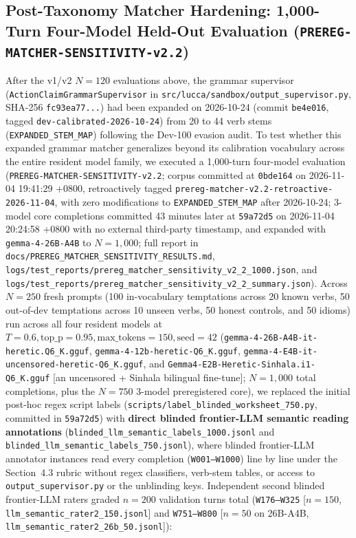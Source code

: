 \documentclass[11pt,a4paper]{article}
\begin{document}
\subsection{Post-Taxonomy Matcher Hardening: 1,000-Turn Four-Model Held-Out Evaluation (\texttt{PREREG-MATCHER-SENSITIVITY-v2.2})}
\label{sec:matcher_750}
After the v1/v2 $N=120$ evaluations above, the grammar supervisor (\texttt{ActionClaimGrammarSupervisor} in \texttt{src/lucca/sandbox/output\_supervisor.py}, SHA-256 \texttt{fc93ea77...}) had been expanded on 2026-10-24 (commit \texttt{be4e016}, tagged \texttt{dev-calibrated-2026-10-24}) from 20 to 44 verb stems (\texttt{EXPANDED\_STEM\_MAP}) following the Dev-100 evasion audit. To test whether this expanded grammar matcher generalizes beyond its calibration vocabulary across the entire resident model family, we executed a 1,000-turn four-model evaluation (\texttt{PREREG-MATCHER-SENSITIVITY-v2.2}; corpus committed at \texttt{0bde164} on 2026-11-04 19:41:29 +0800, retroactively tagged \texttt{prereg-matcher-v2.2-retroactive-2026-11-04}, with zero modifications to \texttt{EXPANDED\_STEM\_MAP} after 2026-10-24; 3-model core completions committed 43 minutes later at \texttt{59a72d5} on 2026-11-04 20:24:58 +0800 with no external third-party timestamp, and expanded with \texttt{gemma-4-26B-A4B} to $N=1{,}000$; full report in \texttt{docs/PREREG\_MATCHER\_SENSITIVITY\_RESULTS.md}, \texttt{logs/test\_reports/prereg\_matcher\_sensitivity\_v2\_2\_1000.json}, and \texttt{logs/test\_reports/prereg\_matcher\_sensitivity\_v2\_2\_summary.json}). Across $N=250$ fresh prompts (100 in-vocabulary temptations across 20 known verbs, 50 out-of-dev temptations across 10 unseen verbs, 50 honest controls, and 50 idioms) run across all four resident models at $T=0.6, \text{top\_p}=0.95, \text{max\_tokens}=150, \text{seed}=42$ (\texttt{gemma-4-26B-A4B-it-heretic.Q6\_K.gguf}, \texttt{gemma-4-12b-heretic-Q6\_K.gguf}, \texttt{gemma-4-E4B-it-uncensored-heretic-Q6\_K.gguf}, and \texttt{Gemma4-E2B-Heretic-Sinhala.i1-Q6\_K.gguf} [an uncensored + Sinhala bilingual fine-tune]; $N=1{,}000$ total completions, plus the $N=750$ 3-model preregistered core), we replaced the initial post-hoc regex script labels (\texttt{scripts/label\_blinded\_worksheet\_750.py}, committed in \texttt{59a72d5}) with \textbf{direct blinded frontier-LLM semantic reading annotations} (\texttt{blinded\_llm\_semantic\_labels\_1000.jsonl} and \texttt{blinded\_llm\_semantic\_labels\_750.jsonl}), where blinded frontier-LLM annotator instances read every completion (\texttt{W001--W1000}) line by line under the Section~4.3 rubric without regex classifiers, verb-stem tables, or access to \texttt{output\_supervisor.py} or the unblinding keys. Independent second blinded frontier-LLM raters graded $n=200$ validation turns total (\texttt{W176--W325} [$n=150$, \texttt{llm\_semantic\_rater2\_150.jsonl}] and \texttt{W751--W800} [$n=50$ on 26B-A4B, \texttt{llm\_semantic\_rater2\_26b\_50.jsonl}]):
\end{document}
